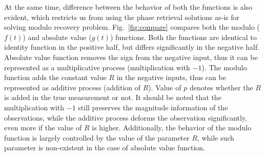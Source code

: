 At the same time, difference between the behavior of both the functions is also evident, which restricts us from using the phase retrieval solutions as-is for solving modulo recovery problem. Fig.~\ref{fig:compare} compares both the modulo ($f(t)$) and absolute value ($g(t)$) functions. Both the functions are identical to identity function in the positive half, but differs significantly in the negative half. Absolute value function removes the sign from the negative input, thus it can be represented as a multiplicative process (multiplication with $-1$).  The modulo function adds the constant value $R$ in the negative inputs, thus can be represented as additive process (addition of $R$). Value of $p$ denotes whether the $R$ is added in the true measurement or not. It should be noted that the multiplication with $-1$ still preserves the magnitude information of the observations, while the additive process deforms the observation significantly, even more if the value of $R$ is higher. Additionally, the behavior of the modulo function is largely controlled by the value of the parameter $R$, while such parameter is non-existent in the case of absolute value function. 

